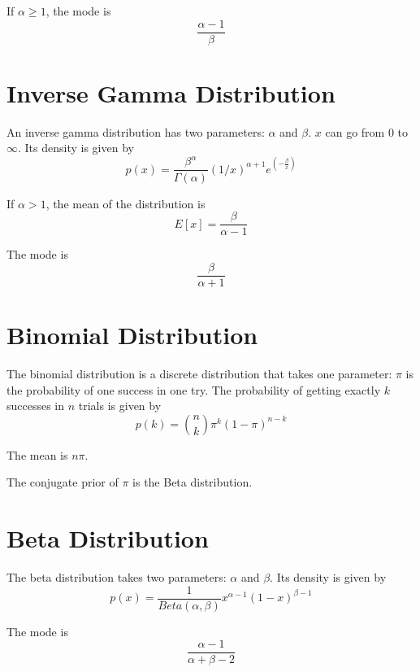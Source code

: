 \documentclass[12pt]{article}
\begin{document}
If $\alpha \geq 1$, the mode is 
\begin{equation*}
\frac{ \alpha - 1}{\beta}
\end{equation*}


\section*{Inverse Gamma Distribution}

An inverse gamma distribution has two parameters: $\alpha$ and $\beta$. $x$ can go from $0$ to $\infty$. Its density is given by
\begin{equation*}
p(x) =
\frac{\beta^\alpha}{\Gamma(\alpha)}(1/x)^{\alpha + 1}e^{\left(-\frac{\beta}{x}\right)}
\end{equation*}

If $\alpha > 1$, the mean of the distribution is
\begin{equation*}
E[x] = \frac{ \beta}{\alpha - 1} 
\end{equation*}

The mode is 
\begin{equation*}
\frac{ \beta}{\alpha + 1}
\end{equation*}

\section*{Binomial Distribution}

The binomial distribution is a discrete distribution that takes one parameter: $\pi$ is the probability of one success in one try. The probability of getting exactly $k$ successes in $n$ trials is given by
\begin{equation*}
p(k) = \binom{n}{k}\pi^k(1-\pi)^{n-k}
\end{equation*}

The mean is $n\pi$.

The conjugate prior of $\pi$ is the Beta distribution.

\section*{Beta Distribution}

The beta distribution takes two parameters: $\alpha$ and $\beta$. Its density is given by
\begin{equation*}
p(x) = \frac{1}{Beta(\alpha,\beta)} x^{\alpha-1}(1-x)^{\beta-1}
\end{equation*}

The mode is
\begin{equation*}
\frac{\alpha - 1} {\alpha + \beta - 2}
\end{equation*}
\end{document}
